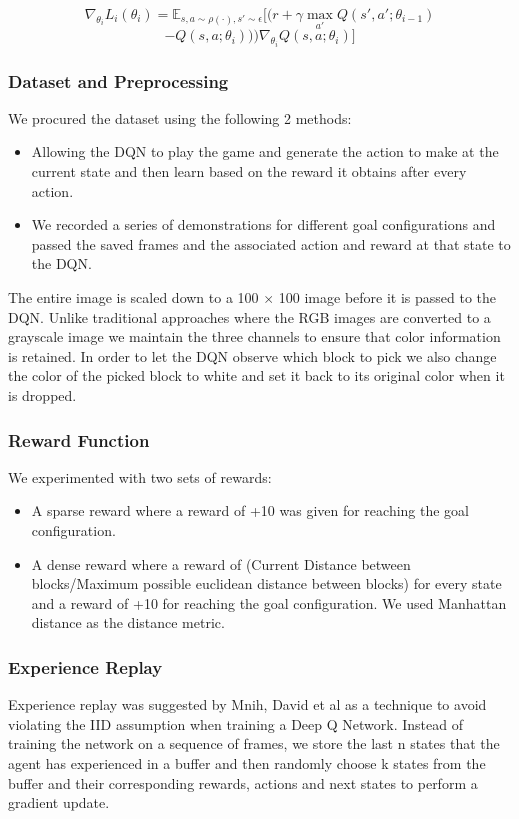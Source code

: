 \documentclass[letterpaper, 12 pt, conference]{ieeeconf}
\begin{document}
$$    \nabla_{\theta_{i}} L_i (\theta_{i}) = \mathbb{E}_{s,a\sim\rho(\cdot), s'\sim\epsilon} [( r + \gamma \max_{a'}Q(s', a'; \theta_{i-1} ) $$
$$ - Q(s, a; \theta_i)) )  \nabla_{\theta_{i}} Q(s, a; \theta_i) ]
$$

\subsubsection{Dataset and Preprocessing}
We procured the dataset using the following 2 methods:
\begin{itemize}
    \item Allowing the DQN to play the game and generate the action to make at the current state and then learn based on the reward it obtains after every action.
    \item We recorded a series of demonstrations for different goal configurations and passed the saved frames and the associated action and reward at that state to the DQN.
\end{itemize}

The entire image is scaled down to a 100 $\times$ 100 image before it is passed to the DQN. Unlike traditional approaches where the RGB images are converted to a grayscale image we maintain the three channels to ensure that color information is retained. In order to let the DQN observe which block to pick we also change the color of the picked block to white and set it back to its original color when it is dropped.

\subsubsection{Reward Function}

We experimented with two sets of rewards:
\begin{itemize}
    \item A sparse reward where a reward of +10 was given for reaching the goal configuration.
    \item A dense reward where a reward of (Current Distance between blocks/Maximum possible euclidean distance between blocks) for every state and a reward of +10 for reaching the goal configuration. We used Manhattan distance as the distance metric.
\end{itemize}

\subsubsection{Experience Replay}
Experience replay was suggested by Mnih, David et al\cite{mnih2013playing} as a technique to avoid violating the IID assumption when training a Deep Q Network. Instead of training the network on a sequence of frames, we store the last n states that the agent has experienced in a buffer and then randomly choose k states from the buffer and their corresponding rewards, actions and next states to perform a gradient update.
\end{document}
